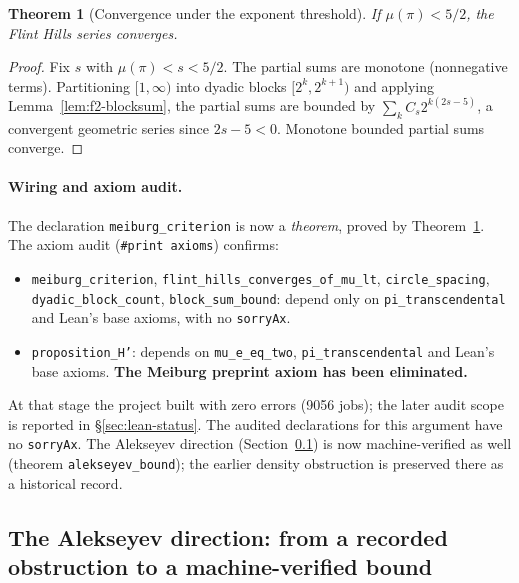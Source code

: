 \documentclass[11pt]{amsart}
\newtheorem{theorem}{Theorem}[section]
\theoremstyle{definition}
\theoremstyle{remark}
\numberwithin{equation}{section}
\newcommand{\irr}{\mu}
\begin{document}
\begin{theorem}[Convergence under the exponent threshold]\label{thm:f2-conv}
If $\irr(\pi)<5/2$, the Flint Hills series converges.
\end{theorem}
\begin{proof}
Fix $s$ with $\irr(\pi)<s<5/2$. The partial sums are monotone (nonnegative terms). Partitioning $[1,\infty)$ into dyadic blocks $[2^k,2^{k+1})$ and applying Lemma~\ref{lem:f2-blocksum}, the partial sums are bounded by $\sum_k C_s 2^{k(2s-5)}$, a convergent geometric series since $2s-5<0$. Monotone bounded partial sums converge.
\end{proof}

\paragraph{Wiring and axiom audit.} The declaration \texttt{meiburg\_\allowbreak{}criterion} is now a \emph{theorem}, proved by Theorem~\ref{thm:f2-conv}. The axiom audit (\texttt{\#print axioms}) confirms:
\begin{itemize}
\item \texttt{meiburg\_\allowbreak{}criterion}, \texttt{flint\_\allowbreak{}hills\_\allowbreak{}converges\_\allowbreak{}of\_\allowbreak{}mu\_\allowbreak{}lt}, \texttt{circle\_\allowbreak{}spacing}, \texttt{dyadic\_\allowbreak{}block\_\allowbreak{}count}, \texttt{block\_\allowbreak{}sum\_\allowbreak{}bound}: depend only on \texttt{pi\_transcendental} and Lean's base axioms, with no \texttt{sorryAx}.
\item \texttt{proposition\_\allowbreak{}H'}: depends on \texttt{mu\_e\_eq\_two}, \texttt{pi\_transcendental} and Lean's base axioms. \textbf{The Meiburg preprint axiom has been eliminated.}
\end{itemize}
At that stage the project built with zero errors (9056 jobs); the later audit scope is reported in \S\ref{sec:lean-status}. The audited declarations for this argument have no \texttt{sorryAx}. The Alekseyev direction (Section~\ref{sec:alekseyev}) is now machine-verified as well (theorem \texttt{alekseyev\_\allowbreak{}bound}); the earlier density obstruction is preserved there as a historical record.

\subsection{The Alekseyev direction: from a recorded obstruction to a machine-verified bound}\label{sec:alekseyev}
\end{document}
